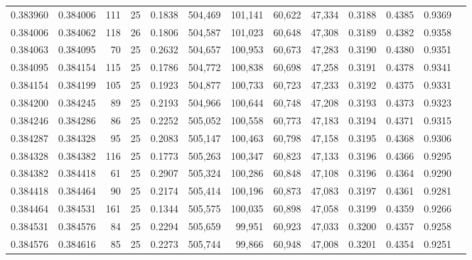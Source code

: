 \begin{tabular}{rrrrrrrrrrrrr}
0.383960 & 0.384006 &   111 &  25 &                                     0.1838 & 504,469 & 101,141 &  60,622 &  47,334 & 0.3188 & 0.4385 & 0.9369 \\
0.384006 & 0.384062 &   118 &  26 &                                     0.1806 & 504,587 & 101,023 &  60,648 &  47,308 & 0.3189 & 0.4382 & 0.9358 \\
0.384063 & 0.384095 &    70 &  25 &                                     0.2632 & 504,657 & 100,953 &  60,673 &  47,283 & 0.3190 & 0.4380 & 0.9351 \\
0.384095 & 0.384154 &   115 &  25 &                                     0.1786 & 504,772 & 100,838 &  60,698 &  47,258 & 0.3191 & 0.4378 & 0.9341 \\
0.384154 & 0.384199 &   105 &  25 &                                     0.1923 & 504,877 & 100,733 &  60,723 &  47,233 & 0.3192 & 0.4375 & 0.9331 \\
0.384200 & 0.384245 &    89 &  25 &                                     0.2193 & 504,966 & 100,644 &  60,748 &  47,208 & 0.3193 & 0.4373 & 0.9323 \\
0.384246 & 0.384286 &    86 &  25 &                                     0.2252 & 505,052 & 100,558 &  60,773 &  47,183 & 0.3194 & 0.4371 & 0.9315 \\
0.384287 & 0.384328 &    95 &  25 &                                     0.2083 & 505,147 & 100,463 &  60,798 &  47,158 & 0.3195 & 0.4368 & 0.9306 \\
0.384328 & 0.384382 &   116 &  25 &                                     0.1773 & 505,263 & 100,347 &  60,823 &  47,133 & 0.3196 & 0.4366 & 0.9295 \\
0.384382 & 0.384418 &    61 &  25 &                                     0.2907 & 505,324 & 100,286 &  60,848 &  47,108 & 0.3196 & 0.4364 & 0.9290 \\
0.384418 & 0.384464 &    90 &  25 &                                     0.2174 & 505,414 & 100,196 &  60,873 &  47,083 & 0.3197 & 0.4361 & 0.9281 \\
0.384464 & 0.384531 &   161 &  25 &                                     0.1344 & 505,575 & 100,035 &  60,898 &  47,058 & 0.3199 & 0.4359 & 0.9266 \\
0.384531 & 0.384576 &    84 &  25 &                                     0.2294 & 505,659 &  99,951 &  60,923 &  47,033 & 0.3200 & 0.4357 & 0.9258 \\
0.384576 & 0.384616 &    85 &  25 &                                     0.2273 & 505,744 &  99,866 &  60,948 &  47,008 & 0.3201 & 0.4354 & 0.9251 \\

\end{tabular}
